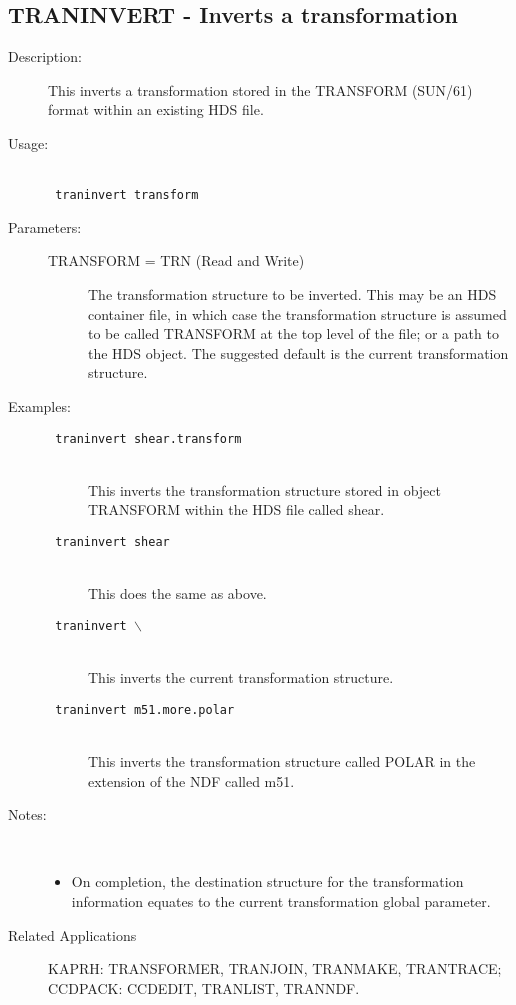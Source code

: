\documentclass[twoside,11pt]{article}
\newcommand{\stardocinitials}  {SUN}
\newcommand{\stardocnumber}    {239.2}
\newcommand{\stardocname}{\stardocinitials /\stardocnumber}
\newcommand{\htmlref}[2]{#1}
\newcommand{\xlabel}[1]{}
\newlength{\sstbannerlength}
\newlength{\sstcaptionlength}
\newlength{\sstexampleslength}
\newlength{\sstexampleswidth}
\newcommand{\sstroutine}[3]{
   \goodbreak
   \markboth{{\stardocname}~ --- #1}{{\stardocname}~ --- #1}
   \rule{\textwidth}{0.5mm}
   \vspace{-7ex}
   \newline
   \settowidth{\sstbannerlength}{{\Large {\bf #1}}}
   \setlength{\sstcaptionlength}{\textwidth}
   \setlength{\sstexampleslength}{\textwidth}
   \addtolength{\sstbannerlength}{0.5em}
   \addtolength{\sstcaptionlength}{-2.0\sstbannerlength}
   \addtolength{\sstcaptionlength}{-4.9pt}
   \settowidth{\sstexampleswidth}{{\bf Examples:}}
   \addtolength{\sstexampleslength}{-\sstexampleswidth}
   \parbox[t]{\sstbannerlength}{\flushleft{\Large {\bf #1}}}
   \parbox[t]{\sstcaptionlength}{\center{\Large #2}}
   \parbox[t]{\sstbannerlength}{\flushright{\Large {\bf #1}}}
   \begin{description}
      #3
   \end{description}
}
\newcommand{\sstdescription}[1]{\item[Description:] #1}
\newcommand{\sstusage}[1]{\pagebreak[3] \item[Usage:] \mbox{} \\[1.3ex] {\ssttt #1}}
\newcommand{\sstparameters}[1]{
   \goodbreak 
   \item[Parameters:] \mbox{} \\
   \vspace{-3.5ex}
   \begin{description}
      #1
   \end{description}
}
\newcommand{\sstexamples}[1]{
   \goodbreak
   \item[Examples:] \mbox{} \\
   \vspace{-3.5ex}
   \begin{description}
      #1
   \end{description}
}
\newcommand{\sstsubsection}[1]{ \item[{#1}] \mbox{} \\}
\newcommand{\sstexamplesubsection}[2]{\sloppy \item{\ssttt #1} \mbox{} \\ #2 }
\newcommand{\sstnotes}[1]{\pagebreak[3] \item[Notes:] \mbox{} \\[1.3ex] #1}
\newcommand{\sstdiytopic}[2]{\goodbreak \item[{\hspace{-0.35em}#1\hspace{-0.35em}:}] \mbox{} \\[1.3ex] #2}
\newenvironment{sstitemize}{%
  \vspace{-4.3ex}\begin{itemize}}{\end{itemize}}
\newcommand{\sstitemlist}[1]{
  \mbox{} \\
  \vspace{-3.5ex}
  \begin{sstitemize}
     #1
  \end{sstitemize}
}
\newcommand{\sstitem}{\item}
\newcommand{\ssttt}{\tt}
\renewcommand{\sstroutine}[3]{
      \subsection{#1\xlabel{#1}-\label{#1}#2}
      \begin{description}
         #3
      \end{description}
   }
\renewcommand{\sstdescription}[1]{\item[Description:]
      \begin{description}
         #1
      \end{description}
   }
\renewcommand{\sstusage}[1]{\htmlref{\item[Usage:]}{ap:usage} \mbox{} \\ {\ssttt #1}}
\renewcommand{\sstparameters}[1]{
      \htmlref{\item[Parameters:]}{se:param}
      \begin{description}
         #1
      \end{description}
   }
\renewcommand{\sstexamples}[1]{
      \htmlref{\item[Examples:]}{ap:example}
      \begin{description}
         #1
      \end{description}
   }
\renewcommand{\sstsubsection}[1]{\item[{#1}]}
\renewcommand{\sstexamplesubsection}[2]{\item[{\ssttt #1}] \\ #2}
\renewcommand{\sstnotes}[1]{\item[Notes:]
      \begin{description}
         #1
      \end{description}
   }
\renewcommand{\sstdiytopic}[2]{\item[{#1}]
      \begin{description}
         #2
      \end{description}
   }
\newcommand{\sstitemlist}[1]{
      \begin{itemize}
         #1
      \end{itemize}
   }
\begin{document}
\sstroutine{
   TRANINVERT
}{
   Inverts a transformation
}{
   \sstdescription{
      This inverts a transformation stored in the TRANSFORM (SUN/61)
      format within an existing HDS file.
   }
   \sstusage{
      traninvert transform
   }
   \sstparameters{
      \sstsubsection{
         TRANSFORM = TRN (Read and Write)
      }{
         The transformation structure to be inverted.  This may be an
         HDS container file, in which case the transformation structure
         is assumed to be called TRANSFORM at the top level of the
         file; or a path to the HDS object.  The suggested default is
         the current transformation structure.
      }
   }
   \sstexamples{
      \sstexamplesubsection{
         traninvert shear.transform
      }{
         This inverts the transformation structure stored in object
         TRANSFORM within the HDS file called shear.
      }
      \sstexamplesubsection{
         traninvert shear
      }{
         This does the same as above.
      }
      \sstexamplesubsection{
         traninvert $\backslash$
      }{
         This inverts the current transformation structure.
      }
      \sstexamplesubsection{
         traninvert m51.more.polar
      }{
         This inverts the transformation structure called POLAR in
         the extension of the NDF called m51.
      }
   }
   \sstnotes{
      \sstitemlist{

         \sstitem
         On completion, the destination structure for the
         transformation information equates to the current transformation
         global parameter.
      }
   }
   \sstdiytopic{
      Related Applications
   }{
      KAPRH: TRANSFORMER, TRANJOIN, TRANMAKE, TRANTRACE;
      CCDPACK: \linebreak CCDEDIT, TRANLIST, TRANNDF.
   }
}
\end{document}
